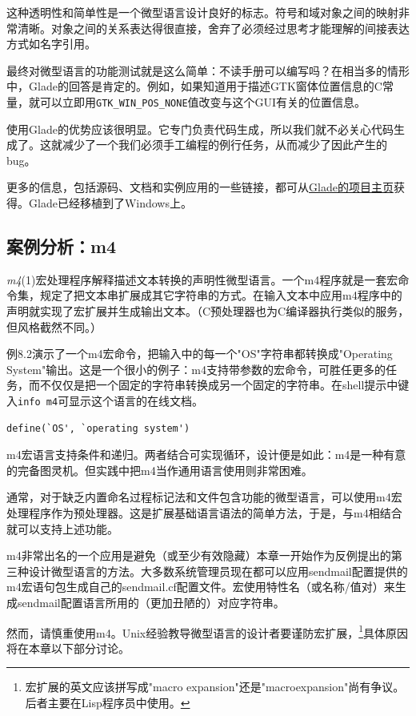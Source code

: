 \documentclass[12pt,oneside]{book}
\begin{document}
这种透明性和简单性是一个微型语言设计良好的标志。符号和域对象之间的映射非常清晰。对象之间的关系表达得很直接，舍弃了必须经过思考才能理解的间接表达方式如名字引用。

最终对微型语言的功能测试就是这么简单：不读手册可以编写吗？在相当多的情形中，Glade的回答是肯定的。例如，如果知道用于描述GTK窗体位置信息的C常量，就可以立即用\verb+GTK_WIN_POS_NONE+值改变与这个GUI有关的位置信息。

使用Glade的优势应该很明显。它专门负责代码生成，所以我们就不必关心代码生成了。这就减少了一个我们必须手工编程的例行任务，从而减少了因此产生的bug。

更多的信息，包括源码、文档和实例应用的一些链接，都可从\href{https://glade.gnome.org/}{Glade的项目主页}获得。Glade已经移植到了Windows上。


\subsection{案例分析：m4}
\textit{m4}(1)宏处理程序解释描述文本转换的声明性微型语言。一个m4程序就是一套宏命令集，规定了把文本串扩展成其它字符串的方式。在输入文本中应用m4程序中的声明就实现了宏扩展并生成输出文本。（C预处理器也为C编译器执行类似的服务，但风格截然不同。）

例8.2演示了一个m4宏命令，把输入中的每一个"OS"字符串都转换成"Operating System"输出。这是一个很小的例子：m4支持带参数的宏命令，可胜任更多的任务，而不仅仅是把一个固定的字符串转换成另一个固定的字符串。在shell提示中键入\verb+info m4+可显示这个语言的在线文档。


\begin{Verbatim}[label=例8.2 m4宏命令实例]
define(`OS', `operating system')
\end{Verbatim}

m4宏语言支持条件和递归。两者结合可实现循环，设计便是如此：m4是一种有意的完备图灵机。但实践中把m4当作通用语言使用则非常困难。

通常，对于缺乏内置命名过程标记法和文件包含功能的微型语言，可以使用m4宏处理程序作为预处理器。这是扩展基础语言语法的简单方法，于是，与m4相结合就可以支持上述功能。

m4非常出名的一个应用是避免（或至少有效隐藏）本章一开始作为反例提出的第三种设计微型语言的方法。大多数系统管理员现在都可以应用sendmail配置提供的m4宏语句包生成自己的sendmail.cf配置文件。宏使用特性名（或名称/值对）来生成sendmail配置语言所用的（更加丑陋的）对应字符串。

然而，请慎重使用m4。Unix经验教导微型语言的设计者要谨防宏扩展，\footnote{宏扩展的英文应该拼写成"macro expansion"还是"macroexpansion"尚有争议。后者主要在Lisp程序员中使用。}具体原因将在本章以下部分讨论。
\end{document}
